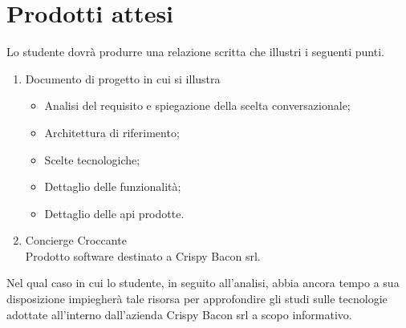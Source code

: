 \section*{Prodotti attesi}
Lo studente dovrà produrre una relazione scritta che illustri i seguenti punti.
\begin{enumerate}
	\item Documento di progetto in cui si illustra
	\begin{itemize}
		\item Analisi del requisito e spiegazione della scelta conversazionale;
		\item Architettura di riferimento;
		\item Scelte tecnologiche;
		\item Dettaglio delle funzionalità;
		\item Dettaglio delle api prodotte.
	\end{itemize}
    \item Concierge Croccante \\
    Prodotto software destinato a Crispy Bacon srl. 
\end{enumerate}
Nel qual caso in cui lo studente, in seguito all'analisi, abbia ancora tempo a sua disposizione impiegherà tale risorsa per approfondire gli studi sulle tecnologie adottate all'interno dall'azienda Crispy Bacon srl a scopo informativo.
